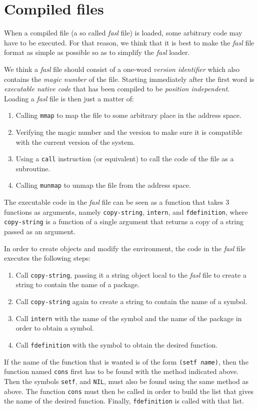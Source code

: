 \chapter{Compiled files}
\label{chap-compiled-files}

When a compiled file (a so called \emph{fasl} file) is loaded, some
arbitrary code may have to be executed.  For that reason, we think
that it is best to make the \emph{fasl} file format as simple as
possible so as to simplify the \emph{fasl} loader.

We think a \emph{fasl} file should consist of a one-word \emph{version
  identifier} which also contains the \emph{magic number} of the
file.  Starting immediately after the first word is \emph{executable
  native code} that has been compiled to be \emph{position
  independent}.  Loading a \emph{fasl} file is then just a matter of:

\begin{enumerate}
\item Calling \texttt{mmap} to map the file to some arbitrary place in
  the address space.
\item Verifying the magic number and the version to make sure it is
  compatible with the current version of the system. 
\item Using a \texttt{call} instruction (or equivalent) to call the
  code of the file as a subroutine.
\item Calling \texttt{munmap} to unmap the file from the address
  space. 
\end{enumerate}

The executable code in the \emph{fasl} file can be seen as a \cl{}
function that takes 3 functions as arguments, namely
\texttt{copy-string}, \texttt{intern}, and \texttt{fdefinition}, where
\texttt{copy-string} is a function of a single argument that returns a
copy of a string passed as an argument. 

In order to create objects and modify the environment, the code in the
\emph{fasl} file executes the following steps:

\begin{enumerate}
\item Call \texttt{copy-string}, passing it a string object local to
  the \emph{fasl} file to create a string to contain the
  name of a package.
\item Call \texttt{copy-string} again to create a string to contain
  the name of a symbol.
\item Call \texttt{intern} with the name of the symbol and the name of
  the package in order to obtain a symbol.
\item Call \texttt{fdefinition} with the symbol to obtain the desired
  function. 
\end{enumerate}

If the name of the function that is wanted is of the form
\texttt{(setf \emph{name})}, then the function named \texttt{cons}
first has to be found with the method indicated above.  Then the 
symbols \texttt{setf}, and \texttt{NIL}, must also be found using the
same method as above.  The function \texttt{cons} must then be called
in order to build the list that gives the name of the desired
function.  Finally, \texttt{fdefinition} is called with that list. 
